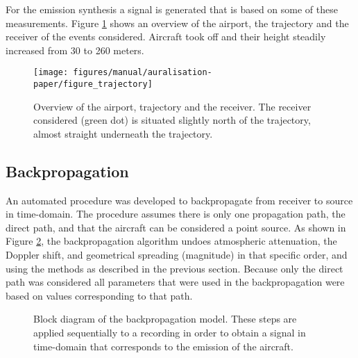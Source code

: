 \documentclass[10pt,twocolumn]{article}
\begin{document}
For the emission synthesis a signal is generated that is based on some
of these measurements. Figure \ref{fig:figure_trajectory} shows an
overview of the airport, the trajectory and the receiver of the events
considered. Aircraft took off and their height steadily increased from 30 to 260
meters.


\begin{figure}[H]
  \centering
  \texttt{[image: figures/manual/auralisation-paper/figure\_trajectory]}
  \caption{Overview of the airport, trajectory and the receiver. The receiver considered
(green dot) is situated slightly north of the trajectory, almost straight underneath the
trajectory.}
  \label{fig:figure_trajectory}
\end{figure}


\subsection{Backpropagation}
An automated procedure was developed to backpropagate from receiver to source in
time-domain. The procedure assumes there is only one propagation path,
the direct path, and that the aircraft can be considered a point source.
As shown in Figure \ref{fig:backpropagation_block_diagram}, the
backpropagation algorithm undoes atmospheric attenuation, the Doppler shift, and
geometrical spreading (magnitude) in that specific order, and using the methods as
described in the previous section.
Because only the direct path was considered all parameters that were used in the
backpropagation were based on values corresponding to that path.

\begin{figure}[H]
  \centering
  \caption{Block diagram of the backpropagation model. These steps are applied sequentially to a recording in order to obtain a signal in time-domain that corresponds to the emission of the aircraft.}
  \label{fig:backpropagation_block_diagram}
\end{figure}
\end{document}
